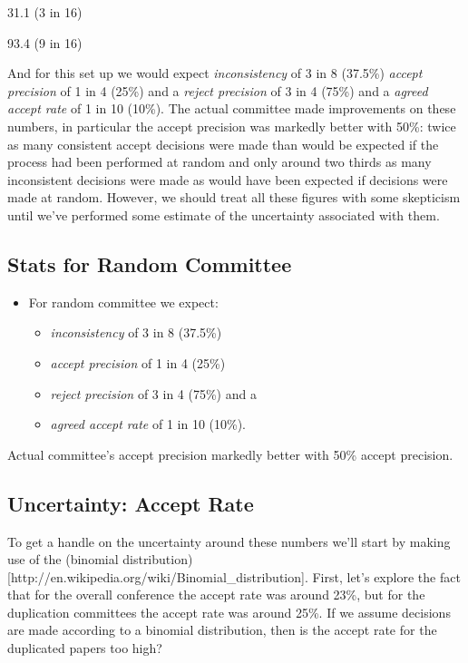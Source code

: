 31.1 (3 in 16)

93.4 (9 in 16)

And for this set up we would expect \emph{inconsistency} of 3 in 8
(37.5\%) \emph{accept precision} of 1 in 4 (25\%) and a \emph{reject
precision} of 3 in 4 (75\%) and a \emph{agreed accept rate} of 1 in 10
(10\%). The actual committee made improvements on these numbers, in
particular the accept precision was markedly better with 50\%: twice as
many consistent accept decisions were made than would be expected if the
process had been performed at random and only around two thirds as many
inconsistent decisions were made as would have been expected if
decisions were made at random. However, we should treat all these
figures with some skepticism until we've performed some estimate of the
uncertainty associated with them.

\hypertarget{stats-for-random-committee}{%
\subsection{Stats for Random
Committee}\label{stats-for-random-committee}}

\begin{itemize}
\tightlist
\item
  For random committee we expect:

  \begin{itemize}
  \tightlist
  \item
    \emph{inconsistency} of 3 in 8 (37.5\%)
  \item
    \emph{accept precision} of 1 in 4 (25\%)
  \item
    \emph{reject precision} of 3 in 4 (75\%) and a
  \item
    \emph{agreed accept rate} of 1 in 10 (10\%).
  \end{itemize}
\end{itemize}

Actual committee's accept precision markedly better with 50\% accept
precision.

\hypertarget{uncertainty-accept-rate}{%
\subsection{Uncertainty: Accept Rate}\label{uncertainty-accept-rate}}

To get a handle on the uncertainty around these numbers we'll start by
making use of the (binomial
distribution){[}http://en.wikipedia.org/wiki/Binomial\_distribution{]}.
First, let's explore the fact that for the overall conference the accept
rate was around 23\%, but for the duplication committees the accept rate
was around 25\%. If we assume decisions are made according to a binomial
distribution, then is the accept rate for the duplicated papers too
high?

